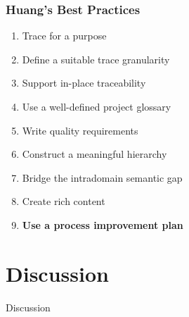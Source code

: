 \documentclass{beamer}
\begin{document}
\begin{frame}
\frametitle{Huang's Best Practices}
\begin{enumerate}
\item Trace for a purpose
\item Define a suitable trace granularity
\item Support in-place traceability
\item Use a well-defined project glossary
\item Write quality requirements
\item Construct a meaningful hierarchy
\item Bridge the intradomain semantic gap
\item Create rich content
\item \textbf{Use a process improvement plan}
\end{enumerate}
\end{frame}


\section{Discussion}
\begin{frame}
\Huge{\centerline{Discussion}}
\end{frame}

\end{document}
